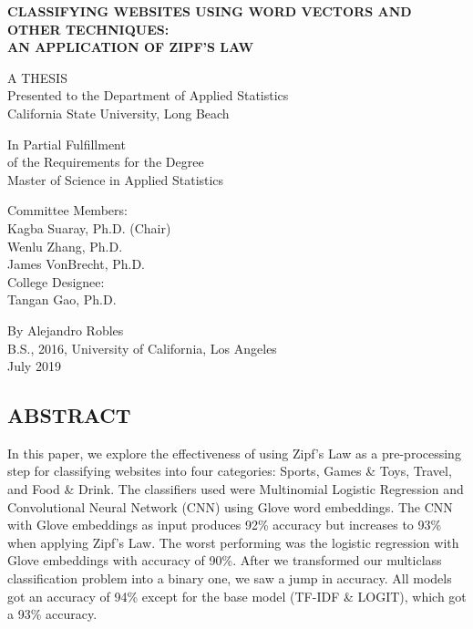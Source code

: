 \documentclass[12pt]{article}
\begin{document}

\begin{titlepage}
	\begin{center}
		
		\normalsize
		\textbf{CLASSIFYING  WEBSITES  USING  WORD  VECTORS  AND  OTHER  TECHNIQUES:}\\
		\medskip
		\textbf{AN APPLICATION OF ZIPF'S LAW}
		
		\vspace{2.1cm}
		
		A THESIS \\
		\medskip
		Presented to the Department of Applied Statistics \\
		\medskip
		California State University, Long Beach
		
		\vspace{2.2cm}
		
		In Partial Fulfillment\\
		\medskip
		of the Requirements for the Degree\\
		\medskip
		Master of Science in Applied Statistics
		
		\vspace{2.2cm}
		
		Committee Members:\\
		\medskip
		Kagba Suaray, Ph.D. (Chair)\\
		Wenlu Zhang, Ph.D.\\
		James VonBrecht, Ph.D.\\
		\medskip
		College Designee:\\
		\medskip
		Tangan Gao, Ph.D.
		
		\vfill
		
		By Alejandro Robles\\
		\medskip
		B.S., 2016, University of California, Los Angeles\\
		\medskip
		July 2019
		
		
	\end{center}
\end{titlepage}

\begin{center}
\section*{ABSTRACT}
\end{center}


In this paper, we explore the effectiveness of using Zipf's Law as a pre-processing step for classifying websites into four categories: Sports, Games \& Toys, Travel, and Food \& Drink. The classifiers used were Multinomial Logistic Regression  and Convolutional Neural Network (CNN) using Glove word embeddings. The CNN with Glove embeddings as input produces 92\% accuracy but increases to 93\% when applying Zipf's Law. The worst performing was the logistic regression with Glove embeddings with accuracy of 90\%. After we transformed our multiclass classification problem into a binary one, we saw a jump in accuracy. All models got an accuracy of 94\% except for the base model (TF-IDF \& LOGIT), which got a 93\% accuracy.
\end{document}
